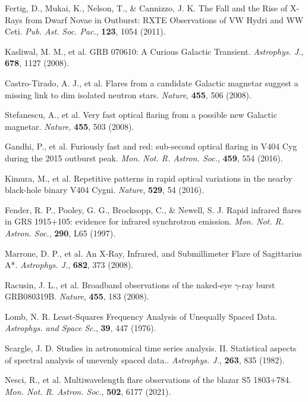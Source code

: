 \documentclass{nature_plusfigure}
\newcommand{\mn}{{Mon. Not. R. Astron. Soc.}}
\newcommand{\mnras}{\mn}
\newcommand{\apj}{{Astrophys. J.}}
\newcommand{\apss}{{Astrophys. and Space Sc.}}
\newcommand{\nat}{{Nature}}
\newcommand{\pasp}{{Pub. Ast. Soc. Pac.}}
\begin{document}
\begin{methods}
\begin{thebibliography}{10}
 Fertig, D., Mukai, K., Nelson, T., \& Cannizzo, J. K. The Fall and the Rise of X-Rays from Dwarf Novae in Outburst: RXTE Observations of VW Hydri and WW Ceti. \emph{\pasp}, \textbf{123}, 1054 (2011). 

 Kasliwal, M. M., et al. GRB 070610: A Curious Galactic Transient. \emph{\apj}, \textbf{678}, 1127 (2008). 

 Castro-Tirado, A. J., et al. Flares from a candidate Galactic magnetar suggest a missing link to dim isolated neutron stars. \emph{\nat}, \textbf{455}, 506 (2008). 

 Stefanescu, A., et al. Very fast optical flaring from a possible new Galactic magnetar. \emph{\nat}, \textbf{455}, 503 (2008). 

 Gandhi, P., et al. Furiously fast and red: sub-second optical flaring in V404 Cyg during the 2015 outburst peak. \emph{\mnras}, \textbf{459}, 554 (2016). 

 Kimura, M., et al. Repetitive patterns in rapid optical variations in the nearby black-hole binary V404 Cygni. \emph{\nat}, \textbf{529}, 54 (2016). 

 Fender, R. P., Pooley, G. G., Brocksopp, C., \& Newell, S. J. Rapid infrared flares in GRS 1915+105: evidence for infrared synchrotron emission. \emph{\mnras}, \textbf{290}, L65 (1997). 

 Marrone, D. P., et al. An X-Ray, Infrared, and Submillimeter Flare of Sagittarius A*. \emph{\apj}, \textbf{682}, 373 (2008). 

 Racusin, J. L., et al. Broadband observations of the naked-eye $\gamma$-ray burst GRB080319B. \emph{\nat}, \textbf{455}, 183 (2008). 

 Lomb, N. R. Least-Squares Frequency Analysis of Unequally Spaced Data. \emph{\apss}, \textbf{39}, 447 (1976). 

 Scargle, J. D. Studies in astronomical time series analysis. II. Statistical aspects of spectral analysis of unevenly spaced data.. \emph{\apj}, \textbf{263}, 835 (1982). 

 Nesci, R., et al. Multiwavelength flare observations of the blazar S5 1803+784. \emph{\mnras}, \textbf{502}, 6177 (2021). 


\end{thebibliography}

\end{methods}
\end{document}
